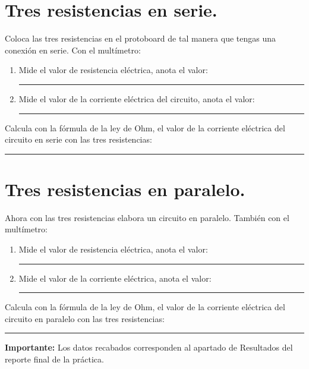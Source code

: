 \documentclass[14pt]{extarticle}
\begin{document}
\section{Tres resistencias en serie.}

Coloca las tres resistencias en el protoboard de tal manera que tengas una conexión en serie. Con el multímetro:
\begin{enumerate}
\item Mide el valor de resistencia eléctrica, anota el valor: \rule{2cm}{0.1mm}
\item Mide el valor de la corriente eléctrica del circuito, anota el valor: \rule{2cm}{0.1mm}
\end{enumerate}
Calcula con la fórmula de la ley de Ohm, el valor de la corriente eléctrica del circuito en serie con las tres resistencias: \rule{2cm}{0.1mm}

\section{Tres resistencias en paralelo.}

Ahora con las tres resistencias elabora un circuito en paralelo. También con el multímetro:
\begin{enumerate}
\item Mide el valor de resistencia eléctrica, anota el valor: \rule{2cm}{0.1mm}
\item Mide el valor de la corriente eléctrica, anota el valor: \rule{2cm}{0.1mm}
\end{enumerate}
Calcula con la fórmula de la ley de Ohm, el valor de la corriente eléctrica del circuito en paralelo con las tres resistencias: \rule{2cm}{0.1mm}


\textbf{Importante:} Los datos recabados corresponden al apartado de Resultados del reporte final de la práctica.
\end{document}
